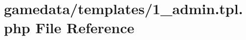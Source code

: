\hypertarget{1__admin_8tpl_8php}{\section{gamedata/templates/1\+\_\+admin.tpl.\+php File Reference}
\label{1__admin_8tpl_8php}
}
